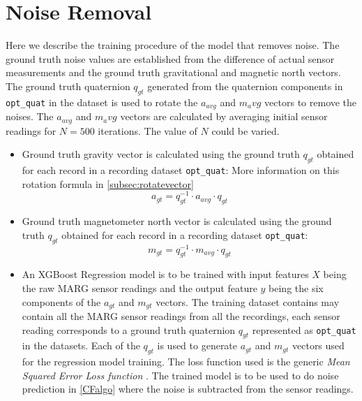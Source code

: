 \documentclass{iutbscthesis}
\begin{document}
\section{Noise Removal} \label{section:noise_removal}
Here we describe the training procedure of the model that removes noise. The ground truth noise values are established from the difference of actual sensor measurements and the ground truth gravitational and magnetic north vectors. The ground truth quaternion $q_{gt}$ generated from the quaternion components in \texttt{opt\_quat} in the dataset is used to rotate the $a_{avg}$ and $m_avg$ vectors to remove the noises. The $a_{avg}$ and $m_avg$ vectors are calculated by averaging initial sensor readings for $N=500$ iterations. The value of $N$ could be varied.
\begin{itemize}
    \item Ground truth gravity vector is calculated using the ground  truth $q_{gt}$ obtained for each record in a recording dataset \texttt{opt\_quat}:
    More information on this rotation formula in \autoref{subsec:rotatevector}
    \begin{equation} \label{eqn:acc noise removal} 
        a_{gt} = q_{gt}^{-1} \cdot a_{avg} \cdot q_{gt}
    \end{equation}
    \item Ground truth magnetometer north vector is calculated using the ground  truth $q_{gt}$ obtained for each record in a recording dataset \texttt{opt\_quat}:
    \begin{equation} \label{eqn:mag noise removal}
        m_{gt} = q_{gt}^{-1} \cdot m_{avg} \cdot q_{gt}
    \end{equation}
    \item An XGBoost Regression model\cite{chen2016xgboost} is to be trained with input features $X$ being the raw MARG sensor readings and the output feature $y$ being the six components of the $a_{gt}$ and $m_{gt}$ vectors. The training dataset contains may contain all the MARG sensor readings from all the recordings, each sensor reading corresponds to a ground truth quaternion $q_{gt}$ represented as \texttt{opt\_quat} in the datasets. Each of the $q_{gt}$ is used to generate $a_{gt}$ and $m_{gt}$ vectors used for the regression model training. The loss function used is the generic \textit{Mean Squared Error Loss function} \cite{bickel2015mathematical}. The trained model is to be used to do noise prediction in \autoref{CFalgo} where the noise is subtracted from the sensor readings.
\end{itemize}
\end{document}
